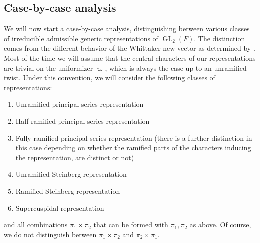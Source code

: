 \documentclass{amsart}
\theoremstyle{plain}
\theoremstyle{plain}
\theoremstyle{remark}
\DeclareMathOperator{\GL}{GL}
\begin{document}
\subsection{Case-by-case analysis}
We will now start a case-by-case analysis, distinguishing between various classes of irreducible admissible generic representations of $\GL_2(F)$. The distinction comes from the different behavior of the Whittaker new vector as determined by \cite{Assing_2018}. Most of the time we will assume that the central characters of our representations are trivial on the uniformizer $\varpi$, which is always the case up to an unramified twist. Under this convention, we will consider the following classes of representations:
\begin{enumerate}
    \item Unramified principal-series representation 
    \item Half-ramified principal-series representation 
    \item Fully-ramified principal-series representation (there is a further distinction in this case depending on whether the ramified parts of the characters inducing the representation, are distinct or not)
    \item Unramified Steinberg representation
    \item Ramified Steinberg representation
    \item Supercuspidal representation
\end{enumerate}
and all combinations $\pi_1\times\pi_2$ that can be formed with $\pi_1,\pi_2$ as above. Of course, we do not distinguish between $\pi_1\times \pi_2$ and $\pi_2\times \pi_1$.
\end{document}
